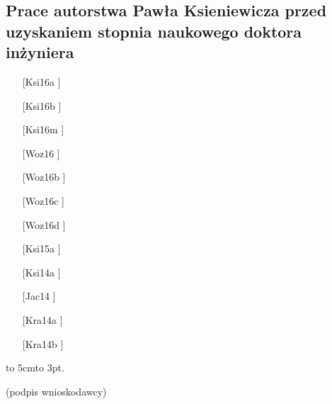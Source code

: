 \subsection{Prace autorstwa Pawła Ksieniewicza przed uzyskaniem stopnia naukowego doktora inżyniera}
{\large
\begin{itemize}
	\item[[Ksi16a]] 
	\item[[Ksi16b]] 
	\item[[Ksi16m]] 
	\item[[Woz16]] 
	\item[[Woz16b]] 
	\item[[Woz16c]] 
	\item[[Woz16d]] 

	\item[[Ksi15a]] 

	\item[[Ksi14a]] 
	\item[[Jac14]] 
	\item[[Kra14a]] 
	\item[[Kra14b]] 
\end{itemize}}


\vfill\noindent\hspace{.75\textwidth}\begin{minipage}{15em}
\begin{center}
	\hbox to 5cm{\leaders\hbox to 3pt{\hss . \hss}\hfil}

	(podpis wnioskodawcy)
\end{center}
\end{minipage}
